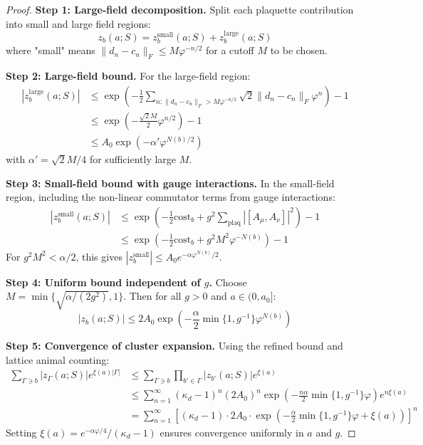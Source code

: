 \documentclass[11pt]{article}
\numberwithin{equation}{section}
\theoremstyle{definition}
\theoremstyle{remark}
\begin{document}
\begin{proof}
\textbf{Step 1: Large-field decomposition.} Split each plaquette contribution into small and large field regions:
\begin{equation}
z_b(a;S) = z_b^{\text{small}}(a;S) + z_b^{\text{large}}(a;S)
\end{equation}
where "small" means $\|d_n - c_n\|_F \leq M\varphi^{-n/2}$ for a cutoff $M$ to be chosen.

\textbf{Step 2: Large-field bound.} For the large-field region:
\begin{align}
|z_b^{\text{large}}(a;S)| &\leq \exp\left(-\frac{1}{2}\sum_{n: \|d_n-c_n\|_F > M\varphi^{-n/2}} \sqrt{2}\|d_n-c_n\|_F \varphi^n\right) - 1 \\
&\leq \exp\left(-\frac{\sqrt{2}M}{2}\varphi^{n/2}\right) - 1 \\
&\leq A_0 \exp(-\alpha' \varphi^{N(b)/2})
\end{align}
with $\alpha' = \sqrt{2}M/4$ for sufficiently large $M$.

\textbf{Step 3: Small-field bound with gauge interactions.} In the small-field region, including the non-linear commutator terms from gauge interactions:
\begin{align}
|z_b^{\text{small}}(a;S)| &\leq \exp\left(-\frac{1}{2}\text{cost}_b + g^2 \sum_{\text{plaq}} |[A_\mu, A_\nu]|^2\right) - 1 \\
&\leq \exp\left(-\frac{1}{2}\text{cost}_b + g^2 M^2 \varphi^{-N(b)}\right) - 1
\end{align}
For $g^2 M^2 < \alpha/2$, this gives $|z_b^{\text{small}}| \leq A_0 e^{-\alpha\varphi^{N(b)}/2}$.

\textbf{Step 4: Uniform bound independent of $g$.} Choose $M = \min\{\sqrt{\alpha/(2g^2)}, 1\}$. Then for all $g > 0$ and $a \in (0, a_0]$:
\begin{equation}
|z_b(a;S)| \leq 2A_0 \exp\left(-\frac{\alpha}{2}\min\{1, g^{-1}\}\varphi^{N(b)}\right)
\end{equation}

\textbf{Step 5: Convergence of cluster expansion.} Using the refined bound and lattice animal counting:
\begin{align}
\sum_{\Gamma \ni b} |z_\Gamma(a;S)| e^{\xi(a)|\Gamma|} &\leq \sum_{\Gamma \ni b} \prod_{b' \in \Gamma} |z_{b'}(a;S)| e^{\xi(a)} \\
&\leq \sum_{n=1}^{\infty} (\kappa_d - 1)^n (2A_0)^n \exp\left(-\frac{n\alpha}{2}\min\{1, g^{-1}\}\varphi\right) e^{n\xi(a)} \\
&= \sum_{n=1}^{\infty} \left[(\kappa_d - 1) \cdot 2A_0 \cdot \exp\left(-\frac{\alpha}{2}\min\{1, g^{-1}\}\varphi + \xi(a)\right)\right]^n
\end{align}
Setting $\xi(a) = e^{-\alpha\varphi/4}/(\kappa_d - 1)$ ensures convergence uniformly in $a$ and $g$.
\end{proof}
\end{document}
